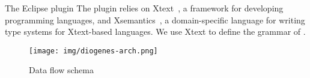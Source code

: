 The Eclipse plugin 
%
The plugin relies on
Xtext~\cite{xtext-site}, a framework for developing programming languages, 
and Xsemantics~\cite{xsemantics-site}, a domain-specific language for writing type systems
for Xtext-based languages.
%
We use Xtext to define the grammar of \coco.


\begin{figure}[t]
    \texttt{[image: img/diogenes-arch.png]}
    \caption{Data flow schema}
    \label{fig:architecture}
\end{figure}